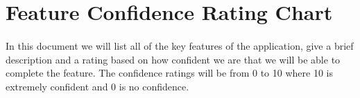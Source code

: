 \documentclass[11pt]{article}
\begin{document}


\section*{\huge{Feature Confidence Rating Chart}}
\paragraph{}In this document we will list all of the key features of the application, give a brief description and a rating based on how confident we are that we will be able to complete the feature. The confidence ratings will be from 0 to 10 where 10 is extremely confident and 0 is no confidence.
\end{document}
